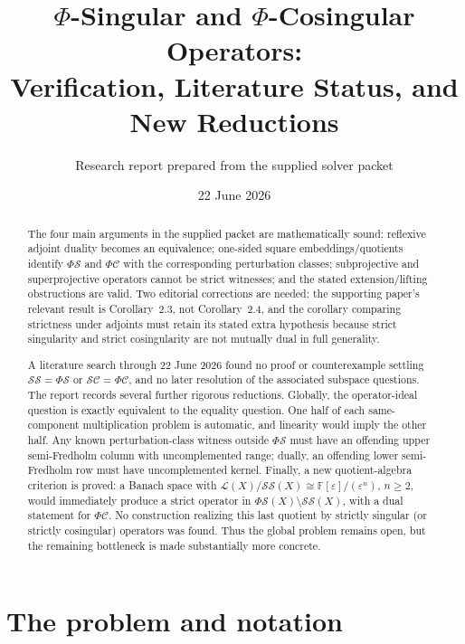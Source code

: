 \documentclass[11pt]{article}
\title{\(\Phi\)-Singular and \(\Phi\)-Cosingular Operators:\\
Verification, Literature Status, and New Reductions}
\author{Research report prepared from the supplied solver packet}
\date{22 June 2026}
\theoremstyle{definition}
\newcommand{\Lop}{\mathcal L}
\newcommand{\SSing}{\mathcal{SS}}
\newcommand{\SCos}{\mathcal{SC}}
\newcommand{\PhiS}{\Phi\mathcal S}
\newcommand{\PhiC}{\Phi\mathcal C}
\newcommand{\F}{\mathbb F}
\begin{document}
\maketitle

\begin{abstract}
The four main arguments in the supplied packet are mathematically sound: reflexive
adjoint duality becomes an equivalence; one-sided square embeddings/quotients identify
\(\PhiS\) and \(\PhiC\) with the corresponding perturbation classes; subprojective and
superprojective operators cannot be strict witnesses; and the stated extension/lifting
obstructions are valid.  Two editorial corrections are needed: the supporting paper's
relevant result is Corollary~2.3, not Corollary~2.4, and the corollary comparing strictness
under adjoints must retain its stated extra hypothesis because strict singularity and strict
cosingularity are not mutually dual in full generality.

A literature search through 22 June 2026 found no proof or counterexample settling
\(\SSing=\PhiS\) or \(\SCos=\PhiC\), and no later resolution of the associated subspace
questions.  The report records several further rigorous reductions.  Globally, the
operator-ideal question is exactly equivalent to the equality question.  One half of each
same-component multiplication problem is automatic, and linearity would imply the other
half.  Any known perturbation-class witness outside \(\PhiS\) must have an offending
upper semi-Fredholm column with uncomplemented range; dually, an offending lower
semi-Fredholm row must have uncomplemented kernel.  Finally, a new quotient-algebra
criterion is proved: a Banach space with
\(\Lop(X)/\SSing(X)\cong\F[\varepsilon]/(\varepsilon^n)\), \(n\ge2\), would immediately
produce a strict operator in \(\PhiS(X)\setminus\SSing(X)\), with a dual statement for
\(\PhiC\).  No construction realizing this last quotient by strictly singular (or strictly
cosingular) operators was found.  Thus the global problem remains open, but the remaining
bottleneck is made substantially more concrete.
\end{abstract}

\section{The problem and notation}
\end{document}

